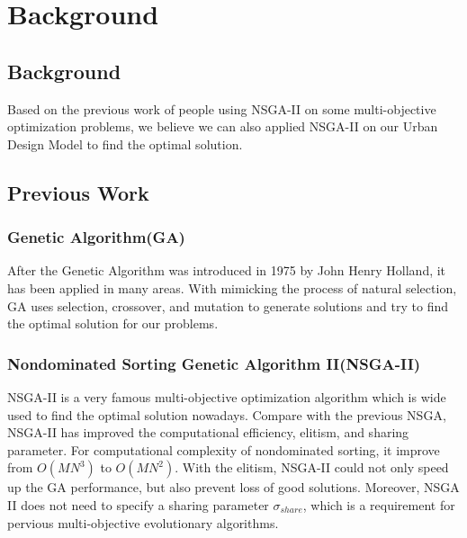 \chapter{Background}
\label{chap:background}

\section{Background}
Based on the previous work of people using NSGA-II on some multi-objective optimization problems\cite{Magnier_2010_Multiobjective}, we believe we can also applied NSGA-II on our Urban Design Model to find the optimal solution. 

\section{Previous Work}

\subsection{Genetic Algorithm(GA)}
After the Genetic Algorithm was introduced in 1975 by John Henry Holland\cite{Holland_1975_Book}, it has been applied in many areas. With mimicking the process of natural selection, GA uses selection, crossover, and mutation to generate solutions and try to find the optimal solution for our problems. 

\subsection{Nondominated Sorting Genetic Algorithm II(NSGA-II)}
NSGA-II\cite{NSGA-II} is a very famous multi-objective optimization algorithm which is wide used  to find the optimal solution nowadays. Compare with the previous NSGA, NSGA-II has improved the computational efficiency, elitism, and sharing parameter. For computational complexity of nondominated sorting, it improve from \(O(MN^{3})\) to \(O(MN^{2})\). With the elitism, NSGA-II could not only speed up the GA performance, but also prevent loss of good solutions. Moreover, NSGA II does not need to specify a sharing parameter \(\sigma_{share}\), which is a requirement for pervious multi-objective evolutionary algorithms.
